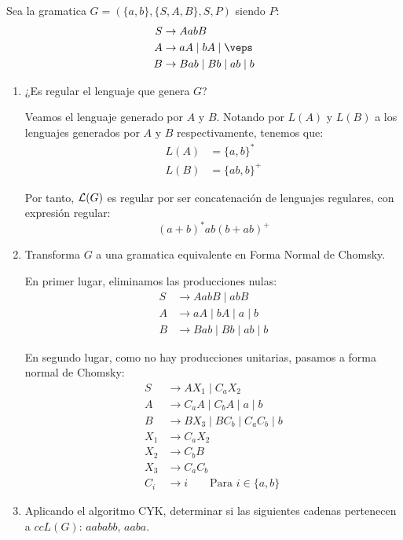 \begin{ejercicio}\label{ej:1.6.14}
    Sea la gramatica $G = (\{a,b\},\{S,A,B\},S,P)$ siendo $P$:
    \begin{align*}
        S&\rightarrow AabB \\
        A &\rightarrow aA \mid bA \mid \veps \\
        B&\rightarrow Bab \mid Bb \mid ab \mid b
    \end{align*}
    \begin{enumerate}
        \item ¿Es regular el lenguaje que genera $G$?
        
        Veamos el lenguaje generado por $A$ y $B$. Notando por $L(A)$ y $L(B)$ a los lenguajes generados por $A$ y $B$ respectivamente, tenemos que:
        \begin{align*}
            L(A) &= \{a,b\}^{\ast} \\
            L(B) &= \{ab,b\}^{+}
        \end{align*}

        Por tanto, $\mathcal{L}(G)$ es regular por ser concatenación de lenguajes regulares, con expresión regular:
        \begin{equation*}
            (a+b)^{\ast}ab(b+ab)^{+}
        \end{equation*}
        \item Transforma $G$ a una gramatica equivalente en Forma Normal de Chomsky.
        
        En primer lugar, eliminamos las producciones nulas:
        \begin{align*}
            S&\rightarrow AabB \mid abB \\
            A &\rightarrow aA \mid bA \mid a \mid b \\
            B&\rightarrow Bab \mid Bb \mid ab \mid b
        \end{align*}

        En segundo lugar, como no hay producciones unitarias, pasamos a forma normal de Chomsky:
        \begin{align*}
            S&\rightarrow AX_1 \mid C_aX_2 \\
            A &\rightarrow C_aA \mid C_bA \mid a \mid b \\
            B&\rightarrow BX_3 \mid BC_b \mid C_aC_b \mid b\\
            X_1 &\rightarrow C_aX_2 \\
            X_2 &\rightarrow C_bB \\
            X_3 &\rightarrow C_aC_b \\
            C_i &\rightarrow i \qquad \text{Para } i\in \{a,b\}
        \end{align*}
        \item Aplicando el algoritmo CYK, determinar si las siguientes cadenas pertenecen a $cc{L}(G)$: $aababb$, $aaba$.
        

\end{enumerate}
\end{ejercicio}

